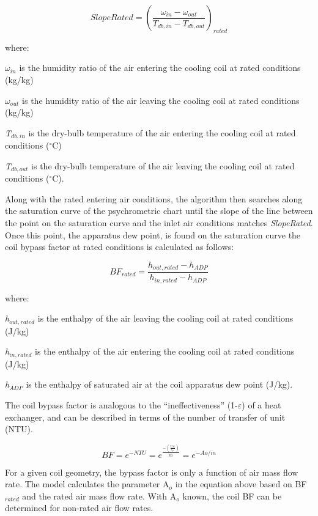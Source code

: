 \begin{equation}
SlopeRated = {\left( {\frac{{{\omega_{in}} - {\omega_{out}}}}{{{T_{db,in}} - {T_{db,out}}}}} \right)_{rated}}
\end{equation}

where:

\emph{\(\omega_{in}\)} is the humidity ratio of the air entering the cooling coil at rated conditions (kg/kg)

\emph{\(\omega_{out}\)} is the humidity ratio of the air leaving the cooling coil at rated conditions (kg/kg)

\emph{T\(_{db,in}\)} is the dry-bulb temperature of the air entering the cooling coil at rated conditions (\(^{\circ}\)C)

\emph{T\(_{db,out}\)} is the dry-bulb temperature of the air leaving the cooling coil at rated conditions (\(^{\circ}\)C).

Along with the rated entering air conditions, the algorithm then searches along the saturation curve of the psychrometric chart until the slope of the line between the point on the saturation curve and the inlet air conditions matches \emph{SlopeRated}. Once this point, the apparatus dew point, is found on the saturation curve the coil bypass factor at rated conditions is calculated as follows:

\begin{equation}
B{F_{rated}} = \frac{{{h_{out,rated}} - {h_{ADP}}}}{{{h_{in,rated}} - {h_{ADP}}}}
\end{equation}

where:

\emph{h\(_{out,rated}\)} is the enthalpy of the air leaving the cooling coil at rated conditions (J/kg)

\emph{h\(_{in,rated}\)} is the enthalpy of the air entering the cooling coil at rated conditions (J/kg)

\emph{h\(_{ADP}\)} is the enthalpy of saturated air at the coil apparatus dew point (J/kg).

The coil bypass factor is analogous to the ``ineffectiveness'' (1-\(\varepsilon\)) of a heat exchanger, and can be described in terms of the number of transfer of unit (NTU).

\begin{equation}
BF = {e^{ - NTU}} = {e^{{\frac{{ - \left( {\frac{{UA}}{{{c_p}}}} \right)}}{\dot m}}}} = {e^{ - Ao/\dot m}}
\end{equation}

For a given coil geometry, the bypass factor is only a function of air mass flow rate. The model calculates the parameter A\(_{o}\) in the equation above based on BF\(_{rated}\) and the rated air mass flow rate. With A\(_{o}\) known, the coil BF can be determined for non-rated air flow rates.

